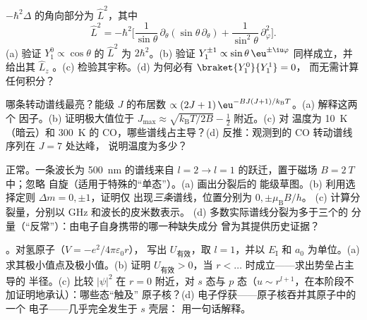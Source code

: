 \begin{exercise}[$\star\star$]\label{exo:b3:quantum-angular-momentum:5}
$-\hbar^2\Delta$ 的角向部分为 $\hat L^2$，其中
\[
\hat L^2 = -\hbar^2\Big[\frac{1}{\sin\theta}\,\partial_\theta
(\sin\theta\,\partial_\theta) +
\frac{1}{\sin^2\theta}\,\partial_\varphi^2\Big] .
\]
(a) 验证 $Y_1^0 \propto \cos\theta$ 的 $\hat L^2$ 
为 $2\hbar^2$。(b) 验证 $Y_1^{\pm1} \propto \sin\theta\,
\eu^{\pm\iu\varphi}$ 同样成立，并给出其 $\hat L_z$ 。(c)
检验其宇称。(d) 为何必有 $\braket{Y_1^0}{Y_1^1} = 0$，
而无需计算任何积分？
\end{exercise}

\begin{exercise}[$\star\star$]\label{exo:b3:quantum-angular-momentum:6}
哪条转动谱线最亮？能级 $J$ 的布居数
$\propto (2J+1)\,\eu^{-BJ(J+1)/k_{\text{B}}T}$。(a) 解释这两个
因子。(b) 证明极大值位于 $J_{\max} \approx
\sqrt{k_{\text{B}}T/2B} - \tfrac12$ 附近。(c) 对
温度为 \qty{10}{K}（暗云）和 \qty{300}{K} 的 CO，哪些谱线占主导？(d)
反推：观测到的 CO 转动谱线序列在 $J = 7$ 处达峰，
说明温度为多少？
\end{exercise}

\begin{exercise}[$\star\star$]\label{exo:b3:quantum-angular-momentum:7}
正常。一条波长为 \qty{500}{nm} 的谱线来自
$l = 2 \to l = 1$ 的跃迁，置于磁场 $B = \qty{2}{T}$ 中；忽略
自旋（适用于特殊的“单态”）。(a) 画出分裂后的
能级草图。(b) 利用选择定则 $\Delta m = 0, \pm1$，证明仅
出现\emph{三条}谱线，位置分别为 $0, \pm\mu_{\text{B}}B/h$。
(c) 计算分裂量，分别以 GHz 和波长的皮米数表示。
(d) 多数实际谱线分裂为多于三个的
分量（“反常”）：由电子自身携带的哪一种缺失成分
曾为其提供历史证据？
\end{exercise}

\begin{exercise}[$\star\star$]\label{exo:b3:quantum-angular-momentum:8}
。对氢原子（$V = -e^2/4\pi\varepsilon_0r$），
写出 $U_{\text{有效}}$，取 $l = 1$，并以 $E_{\text{I}}$ 和
$a_0$ 为单位。(a) 求其极小值点及极小值。(b) 证明 $U_{\text{有效}} >
0$，当 $r < \dots$ 时成立——求出势垒占主导的
半径。(c) 比较 $|\psi|^2$ 在 $r = 0$ 附近，对 $s$ 态与
$p$ 态（$u \sim r^{l+1}$，在本阶段不加证明地承认）：哪些态“触及”
原子核？(d) 电子俘获——原子核吞并其原子中的一个
电子——几乎完全发生于 $s$ 壳层：
用一句话解释。
\end{exercise}

